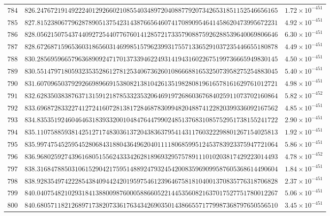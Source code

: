 \documentclass[12pt,reqno]{amsart}
\theoremstyle{remark}
\begin{document}
\begin{longtable}{clc}
$784$ & $826.2476721914922240129266021085540348972040887792073426531851152546656165$ & $1.72\times 10^{-451}$ \\
$785$ & $827.8152380677962878905137542314387665646074170890954641458620473995672231$ & $4.92\times 10^{-451}$ \\
$786$ & $828.0562150754374409272544077676014128572173357908875926288539640069806646$ & $6.30\times 10^{-451}$ \\
$787$ & $828.6726871596536031865603146998515796239931755713365291037235446655180878$ & $4.49\times 10^{-451}$ \\
$788$ & $830.2856959665796368909247170137339462249314194316022675199736665949830145$ & $4.50\times 10^{-451}$ \\
$789$ & $830.5514797180593235352861278125340673626010866688165325073958275254883045$ & $5.40\times 10^{-451}$ \\
$790$ & $831.6070965037929266989669153808213810426135198280819616578161629761012721$ & $4.98\times 10^{-451}$ \\
$791$ & $832.6283503838763713159121878533235320646919726860367684025911073702160864$ & $5.82\times 10^{-452}$ \\
$792$ & $833.6968728332274127241607281381728468783099482048874122820399336092167562$ & $4.85\times 10^{-451}$ \\
$793$ & $834.8353519246046463183933200104847644799024851376831085752951738155241722$ & $2.90\times 10^{-451}$ \\
$794$ & $835.1107588593814251271748303613720438363795414311760322298801267154025813$ & $1.92\times 10^{-451}$ \\
$795$ & $835.9974754525954528068431880436496204011118068599512453783923375947721064$ & $5.86\times 10^{-451}$ \\
$796$ & $836.9680259274396168051556243334262818969329575789111010203817429223014493$ & $4.78\times 10^{-452}$ \\
$797$ & $838.3168478850310615290421759514889247932454200835969099587605368614490604$ & $1.84\times 10^{-451}$ \\
$798$ & $838.9283549742228543840944242019597546123964675818104001370835776318706828$ & $2.37\times 10^{-451}$ \\
$799$ & $840.0407548210293184138800987600058866052214453560821637017527751780012267$ & $5.06\times 10^{-451}$ \\
$800$ & $840.6805711821268971738207336176343426903501438665571779987368797650556510$ & $3.45\times 10^{-451}$ \\

\end{longtable}
\end{document}
